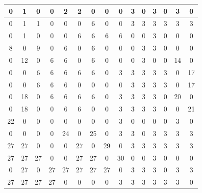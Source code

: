\begin{figure}[H]
	\centering
	\scriptsize %
	\setlength{\tabcolsep}{3.5pt} %
	\renewcommand{\arraystretch}{1.3} %
	\begin{minipage}{0.4\textwidth}
		\centering
		\begin{center}
			\begin{tabular}{|*{15}{c|}}
				\hline
				0 & 1 & 0 & 0 & 2 & 2 & 0 & 0 & 0 & 3 & 0 & 3 & 0 & 3 & 0 \\
				\hline
				0 & 1 & 1 & 0 & 0 & 0 & 6 & 0 & 0 & 3 & 3 & 3 & 3 & 3 & 3 \\
				\hline
				0 & 1 & 0 & 0 & 0 & 6 & 6 & 6 & 6 & 0 & 0 & 3 & 0 & 0 & 0 \\
				\hline
				8 & 0 & 9 & 0 & 6 & 0 & 6 & 0 & 0 & 0 & 3 & 3 & 0 & 0 & 0 \\
				\hline
				0 & 12 & 0 & 6 & 6 & 0 & 6 & 0 & 0 & 0 & 3 & 0 & 0 & 14 & 0 \\
				\hline
				0 & 0 & 6 & 6 & 6 & 6 & 6 & 0 & 3 & 3 & 3 & 3 & 3 & 0 & 17 \\
				\hline
				0 & 0 & 6 & 6 & 6 & 0 & 0 & 0 & 0 & 3 & 3 & 3 & 3 & 0 & 17 \\
				\hline
				0 & 18 & 0 & 6 & 6 & 6 & 6 & 0 & 3 & 3 & 3 & 3 & 0 & 20 & 0 \\
				\hline
				0 & 18 & 0 & 0 & 6 & 6 & 0 & 0 & 3 & 3 & 3 & 3 & 0 & 0 & 21 \\
				\hline
				22 & 0 & 0 & 0 & 0 & 0 & 0 & 0 & 3 & 0 & 0 & 0 & 0 & 3 & 0 \\
				\hline
				0 & 0 & 0 & 0 & 24 & 0 & 25 & 0 & 3 & 3 & 0 & 3 & 3 & 3 & 3 \\
				\hline
				27 & 27 & 0 & 0 & 0 & 27 & 0 & 29 & 0 & 3 & 3 & 3 & 3 & 3 & 3 \\
				\hline
				27 & 27 & 27 & 0 & 0 & 27 & 27 & 0 & 30 & 0 & 0 & 3 & 0 & 0 & 0 \\
				\hline
				0 & 27 & 0 & 27 & 27 & 27 & 27 & 27 & 0 & 3 & 3 & 3 & 0 & 3 & 3 \\
				\hline
				27 & 27 & 27 & 27 & 0 & 0 & 0 & 0 & 3 & 3 & 3 & 3 & 3 & 3 & 0 \\
				\hline
			\end{tabular}
		\end{center}
	\end{minipage}
	\hfill
	\begin{minipage}{0.45\textwidth}
		\centering

\end{minipage}
\end{figure}
